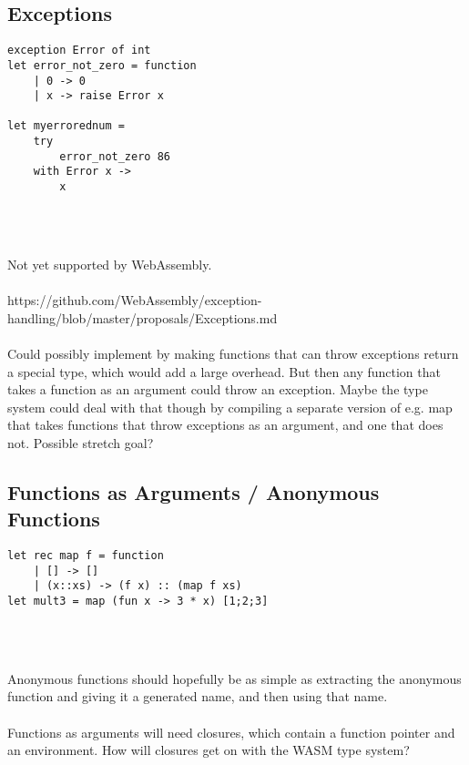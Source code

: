 \documentclass{report}
\begin{document}
\subsection{Exceptions}    
\begin{minipage}{0.4\linewidth}
\begin{verbatim}
exception Error of int
let error_not_zero = function
    | 0 -> 0
    | x -> raise Error x
    
let myerrorednum =
    try 
        error_not_zero 86
    with Error x ->
        x
\end{verbatim}
\end{minipage}  
\begin{minipage}{0.6\linewidth}
\begin{verbatim}

\end{verbatim}
\end{minipage}
\\\\
Not yet supported by WebAssembly.
\\\\
https://github.com/WebAssembly/exception-handling/blob/master/proposals/Exceptions.md
\\\\
Could possibly implement by making functions that can throw exceptions return a special type, which would add a large overhead. But then any function that takes a function as an argument could throw an exception. Maybe the type system could deal with that though by compiling a separate version of e.g. map that takes functions that throw exceptions as an argument, and one that does not. Possible stretch goal?

\subsection{Functions as Arguments / Anonymous Functions}
\begin{minipage}{0.4\linewidth}
\begin{verbatim}
let rec map f = function
    | [] -> []
    | (x::xs) -> (f x) :: (map f xs)
let mult3 = map (fun x -> 3 * x) [1;2;3]
\end{verbatim}
\end{minipage}  
\begin{minipage}{0.6\linewidth}
\begin{verbatim}

\end{verbatim}
\end{minipage}
\\\\
Anonymous functions should hopefully be as simple as extracting the anonymous function and giving it a generated name, and then using that name.
\\\\
Functions as arguments will need closures, which contain a function pointer and an environment. How will closures get on with the WASM type system?
\end{document}
